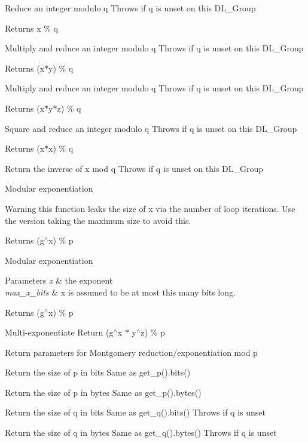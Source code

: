 Reduce an integer modulo q Throws if q is unset on this D\+L\+\_\+\+Group \begin{DoxyReturn}{Returns}
x \% q
\end{DoxyReturn}
Multiply and reduce an integer modulo q Throws if q is unset on this D\+L\+\_\+\+Group \begin{DoxyReturn}{Returns}
(x$\ast$y) \% q
\end{DoxyReturn}
Multiply and reduce an integer modulo q Throws if q is unset on this D\+L\+\_\+\+Group \begin{DoxyReturn}{Returns}
(x$\ast$y$\ast$z) \% q
\end{DoxyReturn}
Square and reduce an integer modulo q Throws if q is unset on this D\+L\+\_\+\+Group \begin{DoxyReturn}{Returns}
(x$\ast$x) \% q
\end{DoxyReturn}
Return the inverse of x mod q Throws if q is unset on this D\+L\+\_\+\+Group

Modular exponentiation

\begin{DoxyWarning}{Warning}
this function leaks the size of x via the number of loop iterations. Use the version taking the maximum size to avoid this.
\end{DoxyWarning}
\begin{DoxyReturn}{Returns}
(g$^\wedge$x) \% p
\end{DoxyReturn}
Modular exponentiation 
\begin{DoxyParams}{Parameters}
{\em x} & the exponent \\
\hline
{\em max\+\_\+x\+\_\+bits} & x is assumed to be at most this many bits long.\\
\hline
\end{DoxyParams}
\begin{DoxyReturn}{Returns}
(g$^\wedge$x) \% p
\end{DoxyReturn}
Multi-\/exponentiate Return (g$^\wedge$x $\ast$ y$^\wedge$z) \% p

Return parameters for Montgomery reduction/exponentiation mod p

Return the size of p in bits Same as get\+\_\+p().bits()

Return the size of p in bytes Same as get\+\_\+p().bytes()

Return the size of q in bits Same as get\+\_\+q().bits() Throws if q is unset

Return the size of q in bytes Same as get\+\_\+q().bytes() Throws if q is unset

